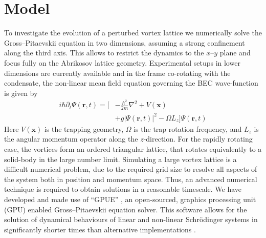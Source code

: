 
\section{Model}\label{sec:model}

To investigate the evolution of a perturbed vortex lattice we numerically solve the Gross--Pitaevskii equation in two dimensions, assuming a strong confinement along the third axis. This allows to restrict the dynamics to the $x$--$y$ plane and focus fully on the Abrikosov lattice geometry. Experimental setups in lower dimensions are currently available \cite{BEC:Stock_lpl_2004,BEC:Seo_jkps_2014,BEC:Chomaz_natcom_2015} and in the frame co-rotating with the condensate, the non-linear mean field equation governing the BEC wave-function is given by
\begin{align}
i\hbar\partial_t \Psi(\mathbf{r},t) = \Big[&-\frac{\hbar^2}{2m}\nabla^2 + V\left(\mathbf{x}\right) \nonumber\\
&+ g\vert \Psi(\mathbf{r},t) \vert^2- \Omega L_z \Big]\Psi(\mathbf{r},t)
\end{align}
Here $V\left(\mathbf{x}\right)$ is the trapping geometry, $\Omega$ is the trap rotation frequency, and $L_z$ is the angular momentum operator along the $z$-direction. For the rapidly rotating case, the vortices form an ordered triangular lattice, that rotates equivalently to a solid-body in the large number limit. Simulating a large vortex lattice is a difficult numerical problem, due to the required grid size to resolve all aspects of the system both in position and momentum space. Thus, an advanced numerical technique is required to obtain solutions in a reasonable timescale. We have developed and made use of ``GPUE'' \cite{GPUEDOI}, an open-sourced, graphics processing unit (GPU) enabled Gross--Pitaevskii equation solver. This software allows for the solution of dynamical behaviours of linear and non-linear Schr\"odinger systems in significantly shorter times than alternative implementations \cite{AO:Morgan_pra_2013,Wittekblog_2016}.


